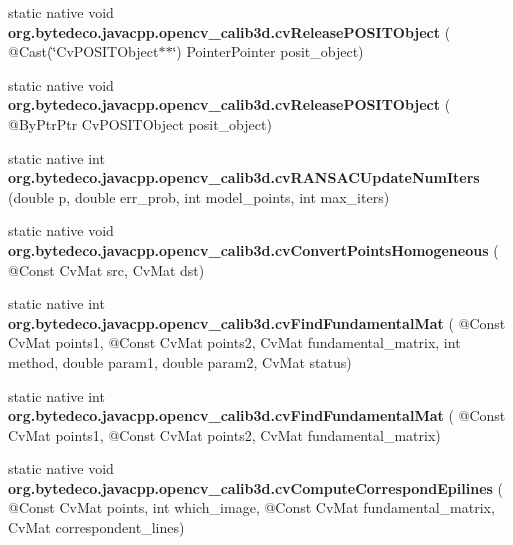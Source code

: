 \begin{DoxyCompactItemize}
\item 
\mbox{\label{group__calib3d__c_gabbfac2446d02ff16d8392d19083f93bd}} 
static native void {\bfseries org.\+bytedeco.\+javacpp.\+opencv\+\_\+calib3d.\+cv\+Release\+P\+O\+S\+I\+T\+Object} ( @Cast(\char`\"{}Cv\+P\+O\+S\+I\+T\+Object$\ast$$\ast$\char`\"{}) Pointer\+Pointer posit\+\_\+object)
\item 
\mbox{\label{group__calib3d__c_ga465ff28007c349576fa420000a0bd186}} 
static native void {\bfseries org.\+bytedeco.\+javacpp.\+opencv\+\_\+calib3d.\+cv\+Release\+P\+O\+S\+I\+T\+Object} ( @By\+Ptr\+Ptr Cv\+P\+O\+S\+I\+T\+Object posit\+\_\+object)
\item 
\mbox{\label{group__calib3d__c_ga1bf7c84f0c6e9335815f4f80c6d7469b}} 
static native int {\bfseries org.\+bytedeco.\+javacpp.\+opencv\+\_\+calib3d.\+cv\+R\+A\+N\+S\+A\+C\+Update\+Num\+Iters} (double p, double err\+\_\+prob, int model\+\_\+points, int max\+\_\+iters)
\item 
\mbox{\label{group__calib3d__c_ga251a31b8c2956839b10446a0088c8668}} 
static native void {\bfseries org.\+bytedeco.\+javacpp.\+opencv\+\_\+calib3d.\+cv\+Convert\+Points\+Homogeneous} ( @Const Cv\+Mat src, Cv\+Mat dst)
\item 
\mbox{\label{group__calib3d__c_ga694185d2997e9c3b29c90744070c0fd8}} 
static native int {\bfseries org.\+bytedeco.\+javacpp.\+opencv\+\_\+calib3d.\+cv\+Find\+Fundamental\+Mat} ( @Const Cv\+Mat points1, @Const Cv\+Mat points2, Cv\+Mat fundamental\+\_\+matrix, int method, double param1, double param2, Cv\+Mat status)
\item 
\mbox{\label{group__calib3d__c_ga122c47e4db7731bbc7cd042ea22721fb}} 
static native int {\bfseries org.\+bytedeco.\+javacpp.\+opencv\+\_\+calib3d.\+cv\+Find\+Fundamental\+Mat} ( @Const Cv\+Mat points1, @Const Cv\+Mat points2, Cv\+Mat fundamental\+\_\+matrix)
\item 
\mbox{\label{group__calib3d__c_gafe960b41ed9c4405db39c638821621aa}} 
static native void {\bfseries org.\+bytedeco.\+javacpp.\+opencv\+\_\+calib3d.\+cv\+Compute\+Correspond\+Epilines} ( @Const Cv\+Mat points, int which\+\_\+image, @Const Cv\+Mat fundamental\+\_\+matrix, Cv\+Mat correspondent\+\_\+lines)
$$
\end{DoxyCompactItemize}
